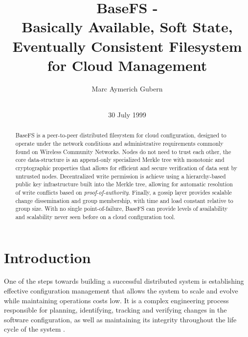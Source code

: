 \documentclass{sig-alternate}
\begin{document}
\title{BaseFS -\\ Basically Available, Soft State, Eventually Consistent Filesystem for Cloud Management}
\author{
\alignauthor
Marc Aymerich Gubern\\
    \\
}
\additionalauthors{}
\date{30 July 1999}

\maketitle


\setcounter{page}{1}


\begin{abstract}
BaseFS is a peer-to-peer distributed filesystem for cloud configuration, designed to operate under the network conditions and administrative requirements commonly found on Wireless Community Networks. Nodes do not need to trust each other, the core data-structure is an append-only specialized Merkle tree with monotonic and cryptographic properties that allows for efficient and secure verification of data sent by untrusted nodes. Decentralized write permission is achieve using a hierarchy-based public key infrastructure built into the Merkle tree, allowing for automatic resolution of write conflicts based on \textit{proof-of-authority}. Finally, a gossip layer provides scalable change dissemination and group membership, with time and load constant relative to group size. With no single point-of-failure, BaseFS can provide levels of availability and scalability never seen before on a cloud configuration tool.
\end{abstract}


\section{Introduction}
One of the steps towards building a successful distributed system is establishing effective configuration management that allows the system to scale and evolve while maintaining operations costs low. It is a complex engineering process responsible for planning, identifying, tracking and verifying changes in the software configuration, as well as maintaining its integrity throughout the life cycle of the system \cite{Yermolaiev:managing}.
\end{document}
